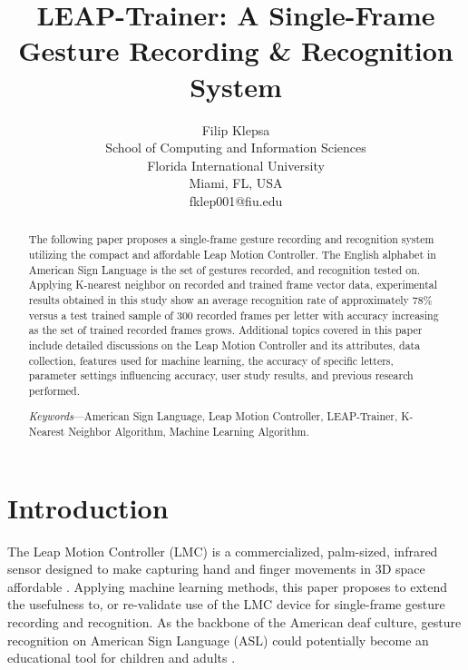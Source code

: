 \documentclass[letterpaper, 10 pt, conference]{ieeeconf}
\title{\huge LEAP-Trainer: A Single-Frame Gesture Recording \& Recognition System}
\author{Filip Klepsa  
\normalsize\\School of Computing and Information Sciences\\Florida International University\\ Miami, FL, USA
\\fklep001@fiu.edu}
\begin{document}
\maketitle
\thispagestyle{empty}
\pagestyle{empty}


\begin{abstract}

The following paper proposes a single-frame gesture recording and recognition system utilizing the compact and affordable Leap Motion Controller. The English alphabet in American Sign Language is the set of gestures recorded, and recognition tested on. Applying K-nearest neighbor on recorded and trained frame vector data, experimental results obtained in this study show an average recognition rate of approximately 78\% versus a test trained sample of 300 recorded frames per letter with accuracy increasing as the set of trained recorded frames grows. Additional topics covered in this paper include detailed discussions on the Leap Motion Controller and its attributes, data collection, features used for machine learning, the accuracy of specific letters, parameter settings influencing accuracy, user study results, and previous research performed.

\vspace{5pt}

\par \textit{Keywords}---American Sign Language, Leap Motion Controller, LEAP-Trainer, K-Nearest Neighbor Algorithm, Machine Learning Algorithm.

\end{abstract}


\section{Introduction}

The Leap Motion Controller (LMC) is a commercialized, palm-sized, infrared sensor designed to make capturing hand and finger movements in 3D space affordable \cite{LMC}. Applying machine learning methods, this paper proposes to extend the usefulness to, or re-validate use of the LMC device for single-frame gesture recording and recognition. As the backbone of the American deaf culture, gesture recognition on American Sign Language (ASL) could potentially become an educational tool for children and adults \cite{ASL}. 
\vspace{5pt}
\end{document}
